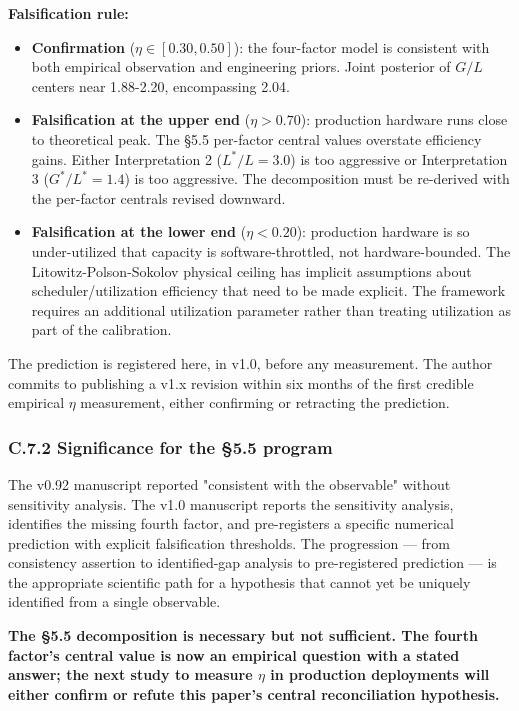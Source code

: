 \documentclass[11pt,a4paper]{article}
\begin{document}
\textbf{Falsification rule:}

\begin{itemize}
  \item \textbf{Confirmation} ($\eta \in [0.30, 0.50]$): the four-factor model is consistent with both empirical observation and engineering priors. Joint posterior of $G/L$ centers near 1.88-2.20, encompassing 2.04.
  \item \textbf{Falsification at the upper end} ($\eta > 0.70$): production hardware runs close to theoretical peak. The §5.5 per-factor central values overstate efficiency gains. Either Interpretation 2 ($L^{*}/L = 3.0$) is too aggressive or Interpretation 3 ($G^{*}/L^{*} = 1.4$) is too aggressive. The decomposition must be re-derived with the per-factor centrals revised downward.
  \item \textbf{Falsification at the lower end} ($\eta < 0.20$): production hardware is so under-utilized that capacity is software-throttled, not hardware-bounded. The Litowitz-Polson-Sokolov physical ceiling has implicit assumptions about scheduler/utilization efficiency that need to be made explicit. The framework requires an additional utilization parameter rather than treating utilization as part of the calibration.
\end{itemize}

The prediction is registered here, in v1.0, before any measurement. The author commits to publishing a v1.x revision within six months of the first credible empirical $\eta$ measurement, either confirming or retracting the prediction.

\subsubsection{C.7.2 Significance for the §5.5 program}

The v0.92 manuscript reported "consistent with the observable" without sensitivity analysis. The v1.0 manuscript reports the sensitivity analysis, identifies the missing fourth factor, and pre-registers a specific numerical prediction with explicit falsification thresholds. The progression --- from consistency assertion to identified-gap analysis to pre-registered prediction --- is the appropriate scientific path for a hypothesis that cannot yet be uniquely identified from a single observable.

\textbf{The §5.5 decomposition is necessary but not sufficient. The fourth factor's central value is now an empirical question with a stated answer; the next study to measure $\eta$ in production deployments will either confirm or refute this paper's central reconciliation hypothesis.}
\end{document}
